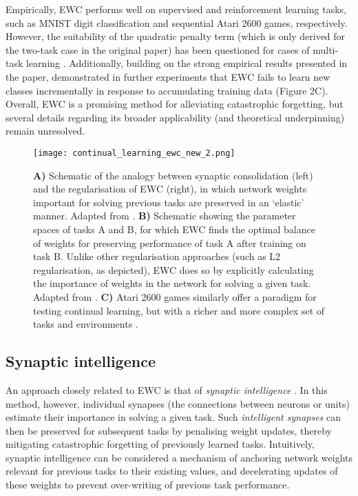 \documentclass{article} %
\begin{document}
Empirically, EWC performs well on supervised and reinforcement learning tasks, such as MNIST digit classification and sequential Atari 2600 games, respectively. However, the suitability of the quadratic penalty term (which is only derived for the two-task case in the original paper) has been questioned for cases of multi-task learning \citep{huszar2018note}. Additionally, building on the strong empirical results presented in the paper, \citet{kemker2018measuring} demonstrated in further experiments that EWC fails to learn new classes incrementally in response to accumulating training data (Figure 2C). Overall, EWC is a promising method for alleviating catastrophic forgetting, but several details regarding its broader applicability (and theoretical underpinning) remain unresolved.

\begin{figure}[h]
\texttt{[image: continual\_learning\_ewc\_new\_2.png]}
\caption{\textbf{A)} Schematic of the analogy between synaptic consolidation (left) and the regularisation of EWC (right), in which network weights important for solving previous tasks are preserved in an ‘elastic’ manner. Adapted from \citet{hassabis2017neuroscience}. \textbf{B)} Schematic showing the parameter spaces of tasks A and B, for which EWC finds the optimal balance of weights for preserving performance of task A after training on task B. Unlike other regularisation approaches (such as L2 regularisation, as depicted), EWC does so by explicitly calculating the importance of weights in the network for solving a given task. Adapted from \citet{kirkpatrick2017overcoming}. \textbf{C)} Atari 2600 games similarly offer a paradigm for testing continual learning, but with a richer and more complex set of tasks and environments \citep{kemker2018measuring}.}
\end{figure}

\subsection*{Synaptic intelligence}

An approach closely related to EWC is that of \textit{synaptic intelligence} \citep{zenke2017continual}. In this method, however, individual synapses (the connections between neurons or units) estimate their importance in solving a given task. Such \textit{intelligent synapses} can then be preserved for subsequent tasks by penalising weight updates, thereby mitigating catastrophic forgetting of previously learned tasks. Intuitively, synaptic intelligence can be considered a mechanism of anchoring network weights relevant for previous tasks to their existing values, and decelerating updates of these weights to prevent over-writing of previous task performance.
\end{document}
